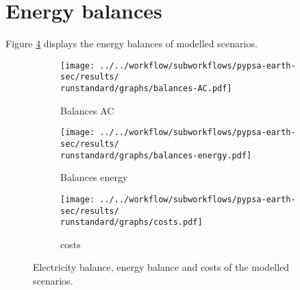 \section{Energy balances}

Figure \ref{fig:barplots} displays the energy balances of modelled scenarios.


\begin{figure}[h!]
    \centering
    \begin{subfigure}[b]{\linewidth}
        \centering
        \texttt{[image: ../../workflow/subworkflows/pypsa-earth-sec/results/\\runstandard/graphs/balances-AC.pdf]}
        \caption{Balances AC}
        \label{fig:balances_AC}
    \end{subfigure}
    
    \vspace{0.5cm} %
    
    \begin{subfigure}[b]{\linewidth}
        \centering
        \texttt{[image: ../../workflow/subworkflows/pypsa-earth-sec/results/\\runstandard/graphs/balances-energy.pdf]}
        \caption{Balances energy}
        \label{fig:balances_energy}
    \end{subfigure}

    \vspace{0.5cm} %
    
    \begin{subfigure}[b]{\linewidth}
        \centering
        \texttt{[image: ../../workflow/subworkflows/pypsa-earth-sec/results/\\runstandard/graphs/costs.pdf]}
        \caption{costs}
        \label{fig:balances_costs}
    \end{subfigure}
    
    \caption{Electricity balance, energy balance and costs of the modelled scenarios.}
    \label{fig:barplots}
\end{figure}

\clearpage